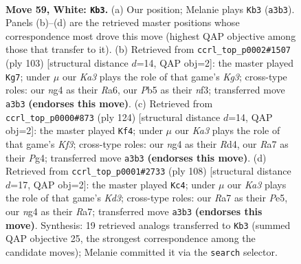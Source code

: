 \documentclass[11pt]{article}
\begin{document}
\clearpage

\begin{figure}[p]\centering
\begin{subfigure}{0.46\textwidth}\centering
\resizebox{\linewidth}{!}{%
\newchessgame
\chessboard[
  setfen={8/R7/8/1P5k/P5n1/K7/7r/8 w - - 4 59},
  showmover=false,
  pgfstyle=straightmove, color=movearrow, markmove={a3-b3}
]}
\caption{}
\end{subfigure}\hfill
\begin{subfigure}{0.46\textwidth}\centering
\resizebox{\linewidth}{!}{%
\newchessgame
\chessboard[
  setfen={8/8/r5kp/8/3R2K1/5N2/8/8 b - - 12 52},
  showmover=false,
  pgfstyle=straightmove, color=movearrow, markmove={g6-g7}
]}
\caption{}
\end{subfigure}
\\[4pt]
\begin{subfigure}{0.46\textwidth}\centering
\resizebox{\linewidth}{!}{%
\newchessgame
\chessboard[
  setfen={8/2r3k1/5p2/8/3R2PP/5K2/8/8 w - - 7 63},
  showmover=false,
  pgfstyle=straightmove, color=movearrow, markmove={f3-f4}
]}
\caption{}
\end{subfigure}\hfill
\begin{subfigure}{0.46\textwidth}\centering
\resizebox{\linewidth}{!}{%
\newchessgame
\chessboard[
  setfen={5k2/R7/4p3/4P3/3P4/3K4/5r2/8 w - - 15 55},
  showmover=false,
  pgfstyle=straightmove, color=movearrow, markmove={d3-c4}
]}
\caption{}
\end{subfigure}
\caption{\textbf{Move 59, White: \texttt{Kb3}.} (a) Our position; Melanie plays \texttt{Kb3} (\texttt{a3b3}). Panels (b)--(d) are the retrieved master positions whose correspondence most drove this move (highest QAP objective among those that transfer to it). (b) Retrieved from \texttt{ccrl\_top\_p0002\#1507} (ply 103) [structural distance $d$=14, QAP obj=2]: the master played \texttt{Kg7}; under $\mu$ our \emph{Ka3} plays the role of that game's \emph{Kg3}; cross-type roles: our \emph{n}g4 as their \emph{R}a6, our \emph{P}b5 as their \emph{n}f3; transferred move \texttt{a3b3} \textbf{(endorses this move)}. (c) Retrieved from \texttt{ccrl\_top\_p0000\#873} (ply 124) [structural distance $d$=14, QAP obj=2]: the master played \texttt{Kf4}; under $\mu$ our \emph{Ka3} plays the role of that game's \emph{Kf3}; cross-type roles: our \emph{n}g4 as their \emph{R}d4, our \emph{R}a7 as their \emph{P}g4; transferred move \texttt{a3b3} \textbf{(endorses this move)}. (d) Retrieved from \texttt{ccrl\_top\_p0001\#2733} (ply 108) [structural distance $d$=17, QAP obj=2]: the master played \texttt{Kc4}; under $\mu$ our \emph{Ka3} plays the role of that game's \emph{Kd3}; cross-type roles: our \emph{R}a7 as their \emph{P}e5, our \emph{n}g4 as their \emph{R}a7; transferred move \texttt{a3b3} \textbf{(endorses this move)}. Synthesis: 19 retrieved analogs transferred to \texttt{Kb3} (summed QAP objective 25, the strongest correspondence among the candidate moves); Melanie committed it via the \texttt{search} selector.}
\label{fig:thought-m116}
\end{figure}
\end{document}
